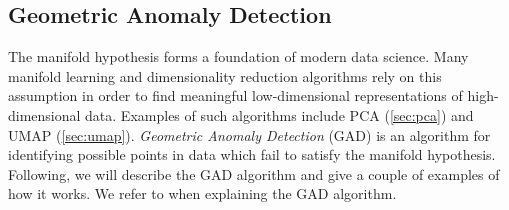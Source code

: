 \subsection{Geometric Anomaly Detection}
\label{sec:geometric-anomaly-detection}
The manifold hypothesis forms a foundation of modern data science. Many manifold learning and dimensionality reduction algorithms rely on this assumption in order to find meaningful low-dimensional representations of high-dimensional data. Examples of such algorithms include PCA (\cref{sec:pca}) and UMAP (\cref{sec:umap}). \textit{Geometric Anomaly Detection} (GAD) \cite{stolz2020geometric} is an algorithm for identifying possible points in data which fail to satisfy the manifold hypothesis. Following, we will describe the GAD algorithm and give a couple of examples of how it works. We refer to \cite{stolz2020geometric} when explaining the GAD algorithm.

